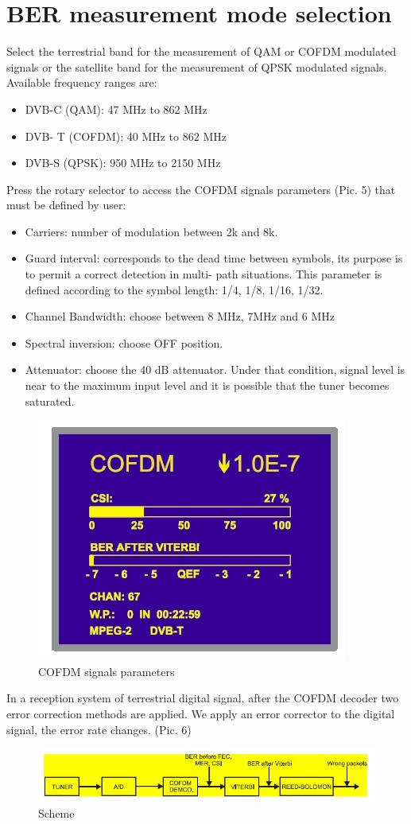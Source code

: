 \documentclass[english]{article}
\begin{document}
\section{BER measurement mode selection}
Select the terrestrial band for the measurement of QAM or COFDM modulated signals or the satellite band for the measurement of QPSK modulated signals. Available frequency ranges are:
\begin{itemize}
\item DVB-C (QAM): 47 MHz to 862 MHz
\item DVB- T (COFDM): 40 MHz to 862 MHz
\item DVB-S (QPSK): 950 MHz to 2150 MHz
\end{itemize}
Press the rotary selector to access the COFDM signals parameters (Pic. 5) that must be defined by user:
\begin{itemize}
\item Carriers: number of modulation between 2k and 8k.
\item Guard interval: corresponds to the dead time between symbols, its purpose is to permit
a correct detection in multi- path situations. This parameter is defined according to the
symbol length: 1/4, 1/8, 1/16, 1/32.
\item Channel Bandwidth: choose between 8 MHz, 7MHz and 6 MHz
\item Spectral inversion: choose OFF position.
\item Attenuator: choose the 40 dB attenuator. Under that condition, signal level is near to
the maximum input level and it is possible that the tuner becomes saturated.
\end{itemize}
\begin{figure}
\centerline{\includegraphics[scale=1]{DTV/Pic5}}
\caption{COFDM signals parameters}
\end{figure}
In a reception system of terrestrial digital signal, after the COFDM decoder two error correction methods are applied. We apply an error corrector to the digital signal, the error rate changes. (Pic. 6)
\begin{figure}
\centerline{\includegraphics[scale=1]{DTV/Pic6}}
\caption{Scheme}
\end{figure}
\end{document}
